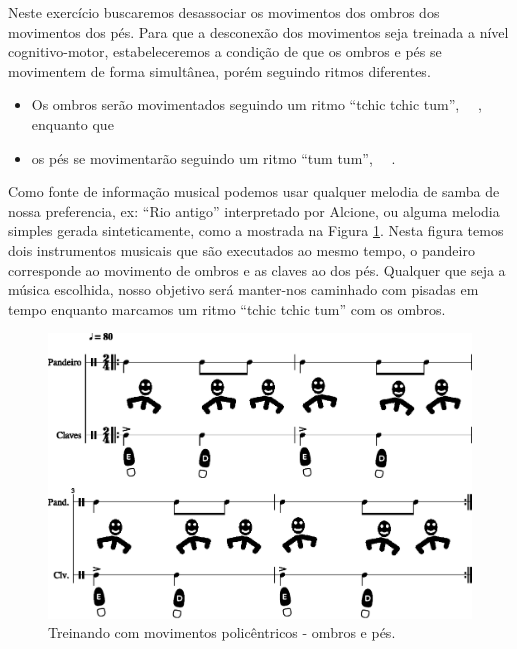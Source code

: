 \begin{example}
Neste exercício buscaremos desassociar os movimentos dos ombros
dos movimentos dos pés.
Para que a desconexão dos movimentos seja treinada a nível cognitivo-motor,
estabeleceremos a condição de que os ombros e pés se movimentem de forma simultânea,
porém seguindo ritmos diferentes.
\begin{itemize}
\item Os ombros serão movimentados seguindo um ritmo ``tchic tchic tum'', 
\leftrepeat~\Vier\Acht\Acht~\rightrepeat, enquanto que 
\item os pés se movimentarão seguindo um ritmo ``tum tum'', 
\leftrepeat~\Vier\Vier~\rightrepeat.
\end{itemize}
Como fonte de informação musical podemos usar qualquer melodia de samba de nossa preferencia,
ex: ``Rio antigo'' interpretado por Alcione,
ou alguma melodia simples gerada sinteticamente, 
como a mostrada na Figura \ref{fig:bodycontrol1-poliritmia-1}.
Nesta figura temos dois instrumentos musicais que são executados ao mesmo tempo,
o pandeiro corresponde ao movimento de ombros e as claves ao dos pés.
Qualquer que seja a música escolhida, nosso objetivo será manter-nos
caminhado com pisadas em tempo enquanto marcamos um ritmo ``tchic tchic tum'' com os ombros.
\end{example}
\begin{figure}[!h]
  \centering
    \includegraphics[width=1.0\textwidth]{chapters/cap-body-isolation/bodycontrol1-poliritmia-1.eps}
\caption{Treinando com movimentos policêntricos - ombros e pés.}
\label{fig:bodycontrol1-poliritmia-1}
\end{figure}

